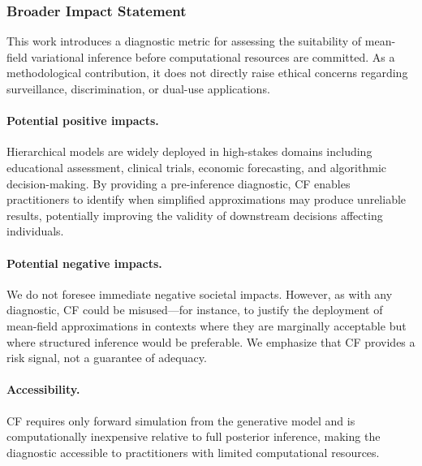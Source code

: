 \documentclass[10pt]{article} %
\theoremstyle{plain}
\theoremstyle{definition}
\begin{document}
\subsubsection*{Broader Impact Statement}

This work introduces a diagnostic metric for assessing the suitability of mean-field variational inference before computational resources are committed. As a methodological contribution, it does not directly raise ethical concerns regarding surveillance, discrimination, or dual-use applications.

\paragraph{Potential positive impacts.} Hierarchical models are widely deployed in high-stakes domains including educational assessment, clinical trials, economic forecasting, and algorithmic decision-making. By providing a pre-inference diagnostic, CF enables practitioners to identify when simplified approximations may produce unreliable results, potentially improving the validity of downstream decisions affecting individuals.

\paragraph{Potential negative impacts.} We do not foresee immediate negative societal impacts. However, as with any diagnostic, CF could be misused---for instance, to justify the deployment of mean-field approximations in contexts where they are marginally acceptable but where structured inference would be preferable. We emphasize that CF provides a risk signal, not a guarantee of adequacy.

\paragraph{Accessibility.} CF requires only forward simulation from the generative model and is computationally inexpensive relative to full posterior inference, making the diagnostic accessible to practitioners with limited computational resources.


\end{document}
